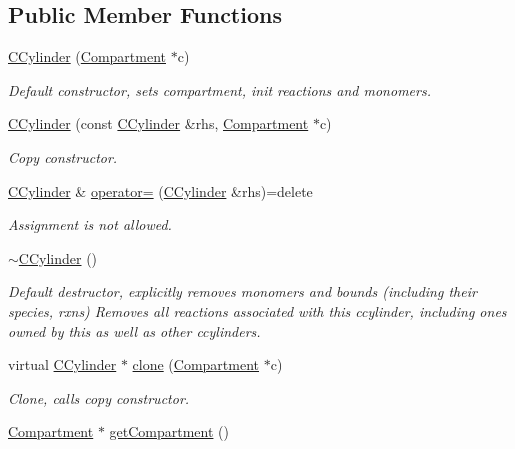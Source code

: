 \subsection*{Public Member Functions}
\begin{DoxyCompactItemize}
\item 
\hyperlink{classCCylinder_a0be01ef2708175a8a147ca45fd290b83}{C\+Cylinder} (\hyperlink{classCompartment}{Compartment} $\ast$c)
\begin{DoxyCompactList}\small\item\em Default constructor, sets compartment, init reactions and monomers. \end{DoxyCompactList}\item 
\hyperlink{classCCylinder_a71863b46b8fee12a2bfb03c12c52f5ee}{C\+Cylinder} (const \hyperlink{classCCylinder}{C\+Cylinder} \&rhs, \hyperlink{classCompartment}{Compartment} $\ast$c)
\begin{DoxyCompactList}\small\item\em Copy constructor. \end{DoxyCompactList}\item 
\hyperlink{classCCylinder}{C\+Cylinder} \& \hyperlink{classCCylinder_a82cdc245e542d14ceab4bb1df061dce4}{operator=} (\hyperlink{classCCylinder}{C\+Cylinder} \&rhs)=delete
\begin{DoxyCompactList}\small\item\em Assignment is not allowed. \end{DoxyCompactList}\item 
\hyperlink{classCCylinder_a715d736c871953942e497290867f591c}{$\sim$\+C\+Cylinder} ()
\begin{DoxyCompactList}\small\item\em Default destructor, explicitly removes monomers and bounds (including their species, rxns) Removes all reactions associated with this ccylinder, including ones owned by this as well as other ccylinders. \end{DoxyCompactList}\item 
virtual \hyperlink{classCCylinder}{C\+Cylinder} $\ast$ \hyperlink{classCCylinder_a5085f34b8f011a8be07b675a59d16d6f}{clone} (\hyperlink{classCompartment}{Compartment} $\ast$c)
\begin{DoxyCompactList}\small\item\em Clone, calls copy constructor. \end{DoxyCompactList}\item 
\hyperlink{classCompartment}{Compartment} $\ast$ \hyperlink{classCCylinder_ab58156c4f6efbe01ad58540fef073930}{get\+Compartment} ()

\end{DoxyCompactItemize}
